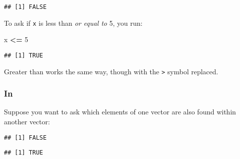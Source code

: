 \documentclass[]{book}
\newenvironment{Shaded}{\begin{snugshade}}{\end{snugshade}}
\newcommand{\CommentTok}[1]{\textcolor[rgb]{0.56,0.35,0.01}{\textit{#1}}}
\newcommand{\DecValTok}[1]{\textcolor[rgb]{0.00,0.00,0.81}{#1}}
\newcommand{\KeywordTok}[1]{\textcolor[rgb]{0.13,0.29,0.53}{\textbf{#1}}}
\newcommand{\NormalTok}[1]{#1}
\newcommand{\OperatorTok}[1]{\textcolor[rgb]{0.81,0.36,0.00}{\textbf{#1}}}
\newcommand{\StringTok}[1]{\textcolor[rgb]{0.31,0.60,0.02}{#1}}
\begin{document}
\begin{verbatim}
## [1] FALSE
\end{verbatim}

To ask if \texttt{x} is less than \emph{or equal to} 5, you run:

\begin{Shaded}
\begin{Highlighting}[]
\NormalTok{x }\OperatorTok{<=}\StringTok{ }\DecValTok{5}
\end{Highlighting}
\end{Shaded}

\begin{verbatim}
## [1] TRUE
\end{verbatim}

Greater than works the same way, though with the \texttt{\textgreater{}} symbol replaced.

\hypertarget{in}{%
\subsubsection*{In}\label{in}}

Suppose you want to ask which elements of one vector are also found within another vector:

\begin{Shaded}
\end{Shaded}

\begin{verbatim}
## [1] FALSE
\end{verbatim}

\begin{Shaded}
\end{Shaded}

\begin{verbatim}
## [1] TRUE
\end{verbatim}

\begin{Shaded}
\end{Shaded}
\end{document}
